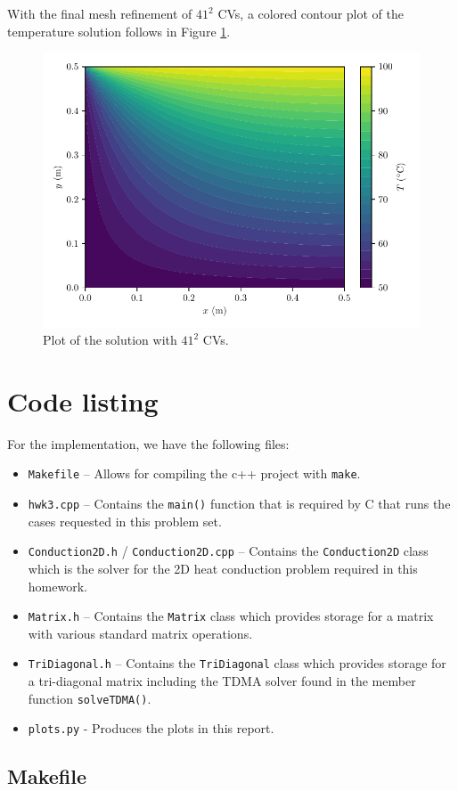 \documentclass{article}
\begin{document}
With the final mesh refinement of $41^2$ CVs, a colored contour plot of the temperature solution follows in Figure \ref{fig:c}.

\begin{figure}[H]
	\centering
	\includegraphics[width=0.7\linewidth]{../results/c}
	\caption{Plot of the solution with $41^2$ CVs.}
	\label{fig:c}
\end{figure}

\section*{Code listing}

For the implementation, we have the following files:
\begin{itemize}
	\item \texttt{Makefile} -- Allows for compiling the c++ project with \texttt{make}.
	\item \texttt{hwk3.cpp} -- Contains the \texttt{main()} function that is required by C that runs the cases requested in this problem set.
	\item \texttt{Conduction2D.h} / \texttt{Conduction2D.cpp} -- Contains the \texttt{Conduction2D} class which is the solver for the 2D heat conduction problem required in this homework.
	\item \texttt{Matrix.h} -- Contains the \texttt{Matrix} class which provides storage for a matrix with various standard matrix operations.
	\item \texttt{TriDiagonal.h} -- Contains the \texttt{TriDiagonal} class which provides storage for a tri-diagonal matrix including the TDMA solver found in the member function \texttt{solveTDMA()}.
	\item \texttt{plots.py} - Produces the plots in this report.
\end{itemize}

\subsection*{Makefile}
\inputminted[fontsize=\small]{Makefile}{../Makefile}
\end{document}
